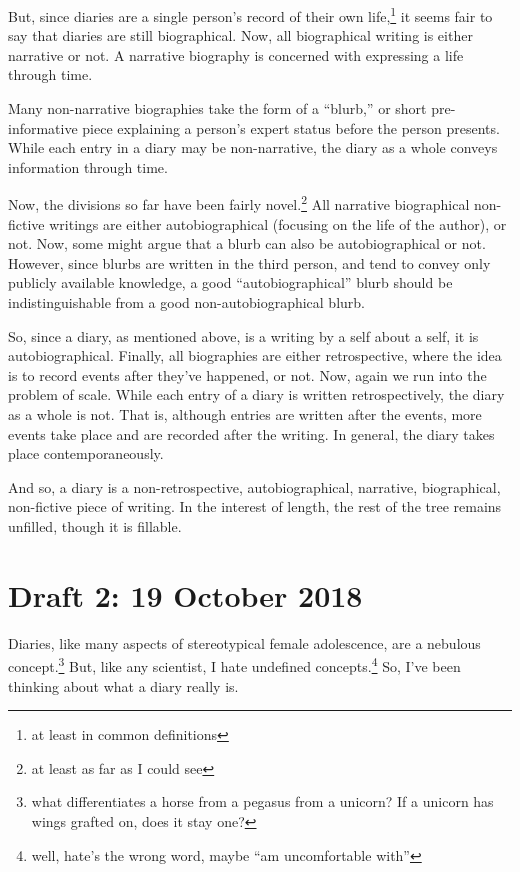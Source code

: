 \documentclass[12pt]{article}[titlepage]
\newcommand{\say}[1]{``#1''}
\newcommand{\1}{\={a}}
\newcommand{\2}{\={e}}
\newcommand{\3}{\={\i}}
\newcommand{\4}{\=o}
\newcommand{\5}{\=u}
\newcommand{\6}{\={A}}
\renewcommand{\,}{\textsuperscript{,}}
\begin{document}
But, since diaries are a single person's record of their own life,\footnote{at least in common definitions} it seems fair to say that diaries are still biographical.
Now, all biographical writing is either narrative or not.
A narrative biography is concerned with expressing a life through time.

Many non-narrative biographies take the form of a \say{blurb,} or short pre-informative piece explaining a person's expert status before the person presents.
While each entry in a diary may be non-narrative, the diary as a whole conveys information through time.

Now, the divisions so far have been fairly novel.\footnote{at least as far as I could see}
All narrative biographical non-fictive writings are either autobiographical (focusing on the life of the author), or not.
Now, some might argue that a blurb can also be autobiographical or not.
However, since blurbs are written in the third person, and tend to convey only publicly available knowledge, a good \say{autobiographical} blurb should be indistinguishable from a good non-autobiographical blurb.

So, since a diary, as mentioned above, is a writing by a self about a self, it is autobiographical.
Finally, all biographies are either retrospective, where the idea is to record events after they've happened, or not.
Now, again we run into the problem of scale.
While each entry of a diary is written retrospectively, the diary as a whole is not.
That is, although entries are written after the events, more events take place and are recorded after the writing.
In general, the diary takes place contemporaneously.

And so, a diary is a non-retrospective, autobiographical, narrative, biographical, non-fictive piece of writing.
In the interest of length, the rest of the tree remains unfilled, though it is fillable.

\section{Draft 2: 19 October 2018}
Diaries, like many aspects of stereotypical female adolescence, are a nebulous concept.\footnote{what differentiates a horse from a pegasus from a unicorn? If a unicorn has wings grafted on, does it stay one?}
But, like any scientist, I hate undefined concepts.\footnote{well, hate's the wrong word, maybe \say{am uncomfortable with}}
So, I've been thinking about what a diary really is.
\end{document}
